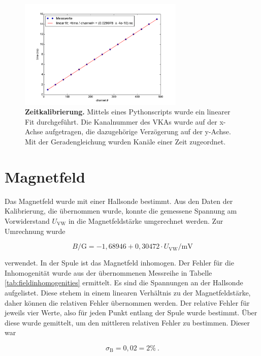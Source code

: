\documentclass[a4paper,ngerman]{scrartcl}
\begin{document}
\begin{figure}[tb!]
\centering
\includegraphics[width=0.7\textwidth]{abbildungen/zeitkalibrierung.pdf}
\caption[Zeitkalibrierung]{\textbf{Zeitkalibrierung.} Mittels eines Pythonscripts wurde ein linearer Fit durchgeführt. Die Kanalnummer des VKAs wurde auf der x-Achse aufgetragen, die dazugehörige Verzögerung auf der y-Achse. Mit der Geradengleichung wurden Kanäle einer Zeit zugeordnet.}
\label{fig:zeitkalibrierung}
\end{figure}





\section{Magnetfeld}

Das Magnetfeld wurde mit einer Hallsonde bestimmt. Aus den Daten der Kalibrierung, die übernommen wurde, konnte die gemessene Spannung am Vorwiderstand $U_{\mathrm{VW}}$ in die Magnetfeldstärke umgerechnet werden. Zur Umrechnung wurde 

\begin{equation}
\label{eqn:B-gauss}
B \mathrm{/G} = -1,68946 + 0,30472 \cdot U_{\mathrm{VW}} \mathrm{/mV}
\end{equation}

verwendet. In der Spule ist das Magnetfeld inhomogen. Der Fehler für die Inhomogenität wurde aus der übernommenen Messreihe in Tabelle \ref{tab:fieldinhomogenities} ermittelt. Es sind die Spannungen an der Hallsonde aufgelistet. Diese stehem in einem linearen Verhältnis zu der Magnetfeldstärke, daher können die relativen Fehler übernommen werden. Der relative Fehler für jeweils vier Werte, also für jeden Punkt entlang der Spule wurde bestimmt. Über diese wurde gemittelt, um den mittleren relativen Fehler zu bestimmen. Dieser war

\begin{equation}
\label{eqn:inhomogen_fehler}
\sigma_{\mathrm{B}} = 0,02 = 2 \% ~.
\end{equation}
\end{document}
